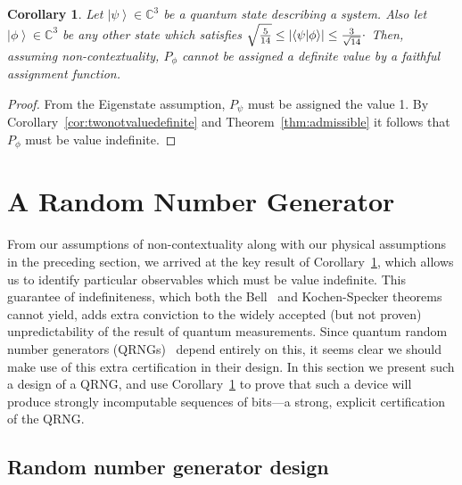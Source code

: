 \documentclass[%
 preprint,
 showpacs,
 showkeys,
 amsmath,
 amssymb,
 aps,
 pra,
 ]{revtex4-1}
\newtheorem{Corollary}[Theorem]{Corollary}
\theoremstyle{definition}
\newcommand{\ket}[1]{\left| #1 \right>}
\newcommand{\iprod}[2]{\langle #1 | #2 \rangle}
\begin{document}
\begin{Corollary}
	\label{col:VIContext}
	Let $\ket{\psi} \in \mathbb{C}^3$ be a quantum state describing a system.
	Also let $\ket{\phi} \in \mathbb{C}^3$ be any other state which satisfies $\sqrt{\frac{5}{14}} \le |\iprod{\psi}{\phi}| \le \frac{3}{\sqrt{14}}\raisebox{.8mm}{.}$
	Then, assuming non-contextuality, $P_\phi$ cannot be assigned a definite value by a faithful assignment function.
\end{Corollary}
\begin{proof}
	From the Eigenstate assumption, $P_\psi$ must be assigned the value 1. By Corollary~\ref{cor:twonotvaluedefinite} and Theorem~\ref{thm:admissible} it follows that $P_\phi$ must be value indefinite.
\end{proof}

\section{A Random Number Generator}

From our assumptions of non-contextuality along with our physical assumptions in the preceding section, we arrived at the key result of Corollary~\ref{col:VIContext}, which allows us to identify particular observables which must be value indefinite.
This guarantee of indefiniteness, which both the Bell~\cite{bell-66} and Kochen-Specker theorems cannot yield, adds extra conviction to the widely accepted (but not proven) unpredictability of the result of quantum measurements.
Since quantum random number generators (QRNGs)~\cite{Kwon:09,10.1038/nature09008,stefanov-2000,svozil-2009-howto,Wayne-09,stipcevic045104,Ma:05} depend entirely on this, it seems clear we should make use of this extra certification in their design.
In this section we present such a design of a QRNG, and use Corollary~\ref{col:VIContext} to prove that such a device will produce strongly incomputable sequences of bits---a strong, explicit certification of the QRNG.

\subsection{Random number generator design}
\end{document}
